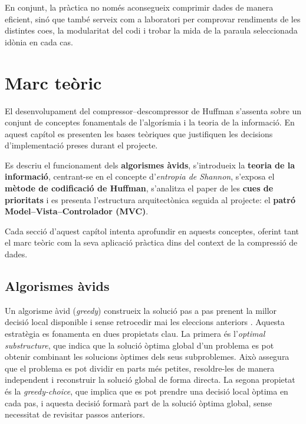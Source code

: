 \documentclass{ieeetj}
\begin{document}
\noindent

\bigskip
\noindent
En conjunt, la pràctica no només aconsegueix comprimir dades de manera eficient, sinó que també serveix com a laboratori per comprovar rendiments de les distintes coes, la modularitat del codi i trobar la mida de la paraula seleccionada idònia en cada cas.

\section{Marc teòric} 


El desenvolupament del compressor–descompressor de Huffman s'assenta sobre un conjunt de conceptes fonamentals de l'algorísmia i la teoria de la informació.  
En aquest capítol es presenten les bases teòriques que justifiquen les decisions d'implementació preses durant el projecte.

Es descriu el funcionament dels \textbf{algorismes àvids}, s'introdueix la \textbf{teoria de la informació}, centrant-se en el concepte d'\emph{entropia de Shannon}, s'exposa el \textbf{mètode de codificació de Huffman}, s'analitza el paper de les \textbf{cues de prioritats} i es presenta l'estructura arquitectònica seguida al projecte: el \textbf{patró Model–Vista–Controlador (MVC)}.

Cada secció d'aquest capítol intenta aprofundir en aquests conceptes, oferint tant el marc teòric com la seva aplicació pràctica dins del context de la compressió de dades.

\subsection{Algorismes àvids}\label{subsec:greedy}
Un algorisme àvid (\emph{greedy})  construeix la solució pas a pas prenent la millor decisió local disponible i sense retrocedir mai les eleccions anteriors \cite{cormen2022}. 
Aquesta estratègia es fonamenta en dues propietats clau. La primera és l’\textit{optimal substructure}, que indica que la solució òptima global d’un problema es pot obtenir combinant les solucions òptimes dels seus subproblemes. Això assegura que el problema es pot dividir en parts més petites, resoldre-les de manera independent i reconstruir la solució global de forma directa. La segona propietat és la \textit{greedy-choice}, que implica que es pot prendre una decisió local òptima en cada pas\cite{greedy}, i aquesta decisió formarà part de la solució òptima global, sense necessitat de revisitar passos anteriors.\newline
\end{document}
